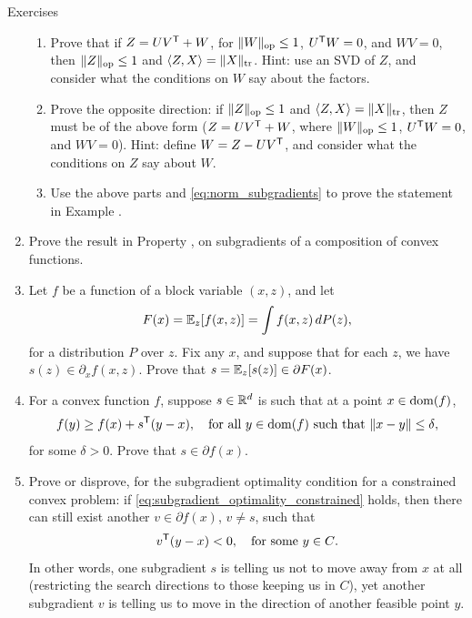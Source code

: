 \begin{xcb}{Exercises}
\begin{enumerate}[label=\thechapter.\arabic*]
\begin{enumerate}[label=\alph*.]
\item Prove that if $Z = U V^{\mathsf{T}} + W$, for $\|W\|_{\mathrm{op}} \leq 1$, $U^{\mathsf{T}} W = 0$,
  and $W V = 0$, then $\|Z\|_{\mathrm{op}} \leq 1$ and $\langle Z, X \rangle =
  \|X\|_{\operatorname{tr}}$. Hint: use an SVD of $Z$, and consider what the conditions on $W$
  say about the factors.   

\item Prove the opposite direction: if $\|Z\|_{\mathrm{op}} \leq 1$ and $\langle Z, X
  \rangle = \|X\|_{\operatorname{tr}}$, then $Z$ must be of the above form ($Z = U V^{\mathsf{T}} + W$,   
  where $\|W\|_{\mathrm{op}} \leq 1$, $U^{\mathsf{T}} W = 0$, and $W V = 0$). Hint: define $W = Z
  - U V^{\mathsf{T}}$, and consider what the conditions on $Z$ say about $W$. 

\item Use the above parts and \eqref{eq:norm_subgradients} to prove the
  statement in Example .
\end{enumerate}

\item Prove the result in Property , on
  subgradients of a composition of convex functions.   

\item Let $f$ be a function of a block variable $(x,z)$, and let 
  \[
  F(x) = \mathbb{E}_z[ f(x,z) ] = \int f(x,z) \, dP(z),
  \]
  for a distribution $P$ over $z$. Fix any $x$, and suppose that for each $z$,
  we have $s(z) \in \partial_x f(x,z)$. Prove that $s = \mathbb{E}_z[s(z)] \in \partial
  F(x)$.  

\item For a convex function $f$, suppose $s \in \mathbb{R}^d$ is such that at a point $x
  \in \operatorname{dom}(f)$,
  \[
  f(y) \geq f(x) + s^{\mathsf{T}} (y-x), \quad \text{for all $y \in \operatorname{dom}(f)$ such that
    $\|x - y\| \leq \delta$},
  \]
  for some $\delta>0$. Prove that $s \in \partial f(x)$. %

\item Prove or disprove, for the subgradient optimality condition for a
  constrained convex problem: if \eqref{eq:subgradient_optimality_constrained} 
  holds, then there can still exist another $v \in \partial f(x)$, $v \not= s$,
  such that 
  \[
  v^{\mathsf{T}} (y - x) < 0, \quad \text{for some $y \in C$}.
  \]
  In other words, one subgradient $s$ is telling us not to move away from $x$ at
  all (restricting the search directions to those keeping us in $C$), yet
  another subgradient $v$ is telling us to move in the direction of another   
  feasible point $y$.   


\end{enumerate}
\end{xcb}
